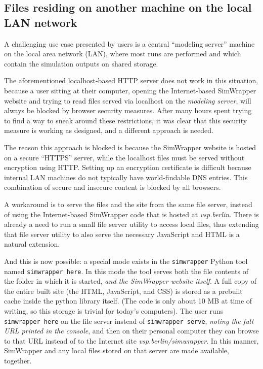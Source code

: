 \hypertarget{simwrapper-files-residing-on-another-machine-on-the-local-lan-network}{%
\subsection{Files residing on another machine on the local LAN network}\label{simwrapper-files-residing-on-another-machine-on-the-local-lan-network}}

A challenging use case presented by users is a central ``modeling server'' machine on the local area network (LAN), where most runs are performed and which contain the simulation outputs on shared storage.

The aforementioned localhost-based HTTP server does not work in this situation, because a user sitting at their computer, opening the Internet-based SimWrapper website and trying to read files served via localhost on the \emph{modeling server}, will always be blocked by browser security measures. After many hours spent trying to find a way to sneak around these restrictions, it was clear that this security measure is working as designed, and a different approach is needed.

The reason this approach is blocked is because the SimWrapper website is hosted on a secure ``HTTPS'' server, while the localhost files must be served without encryption using HTTP. Setting up an encryption certificate is difficult because internal LAN machines do not typically have world-findable DNS entries. This combination of secure and insecure content is blocked by all browsers.

A workaround is to serve the files and the site from the same file server, instead of using the Internet-based SimWrapper code that is hosted at \emph{vsp.berlin}. There is already a need to run a small file server utility to access local files, thus extending that file server utility to also serve the necessary JavaScript and HTML is a natural extension.

And this is now possible: a special mode exists in the \texttt{simwrapper} Python tool named \texttt{simwrapper\ here}. In this mode the tool serves both the file contents of the folder in which it is started, \emph{and the SimWrapper website itself}. A full copy of the entire built site (the HTML, JavaScript, and CSS) is stored as a prebuilt cache inside the python library itself. (The code is only about 10 MB at time of writing, so this storage is trivial for today's computers). The user runs \texttt{simwrapper\ here} on the file server instead of \texttt{simwrapper\ serve}, \emph{noting the full URL printed in the console}, and then on their personal computer they can browse to that URL instead of to the Internet site \emph{vsp.berlin/simwrapper}. In this manner, SimWrapper and any local files stored on that server are made available, together.

